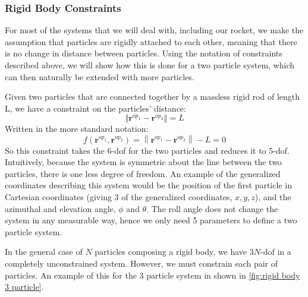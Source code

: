 \subsubsection{Rigid Body Constraints}\label{sec: rigid body constraints}
For most of the systems that we will deal with, including our rocket, we make the assumption that particles are rigidly attached to each other, meaning that there is no change in distance between particles. Using the notation of constraints described above, we will show how this is done for a two particle system, which can then naturally be extended with more particles.

Given two particles that are connected together by a massless rigid rod of length L, we have a constraint on the particles' distance:
$$\left\Vert \bm{r}^{op_1}-\bm{r}^{op_2}\right\Vert=L$$
Written in the more standard notation:
$$f\left(\bm{r}^{op_1},\bm{r}^{ op_2}\right)=\left\|\bm{r}^{op_1}-\bm{r}^{ op_2}\right\|-L=0$$
So this constraint takes the 6-\gls{dof} for the two particles and reduces it to 5-\gls{dof}. Intuitively, because the system is symmetric about the line between the two particles, there is one less degree of freedom. An example of the generalized coordinates describing this system would be the position of the first particle in Cartesian coordinates (giving 3 of the generalized coordinates, $x,y,z$), and the azimuthal and elevation angle, $\phi$ and $\theta$. The roll angle does not change the system in any measurable way, hence we only need 5 parameters to define a two particle system.

In the general case of $N$ particles composing a \gls{rigid body}, we have $3N$-\gls{dof} in a completely unconstrained system. However, we must constrain each pair of particles. An example of this for the 3 particle system in shown in \autoref{fig:rigid body 3 particle}.

